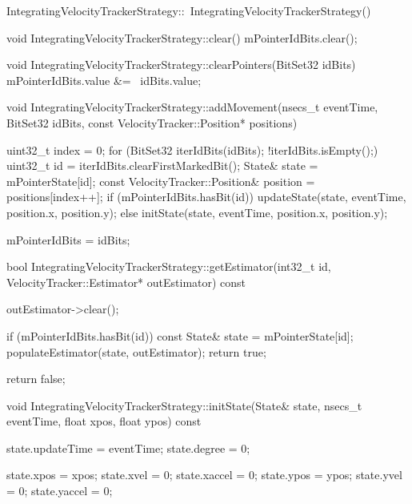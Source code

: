 IntegratingVelocityTrackerStrategy::~IntegratingVelocityTrackerStrategy() {
}

void IntegratingVelocityTrackerStrategy::clear() {
    mPointerIdBits.clear();
}

void IntegratingVelocityTrackerStrategy::clearPointers(BitSet32 idBits) {
    mPointerIdBits.value &= ~idBits.value;
}

void IntegratingVelocityTrackerStrategy::addMovement(nsecs_t eventTime, BitSet32 idBits,
                                                     const VelocityTracker::Position* positions) {
    uint32_t index = 0;
    for (BitSet32 iterIdBits(idBits); !iterIdBits.isEmpty();) {
        uint32_t id = iterIdBits.clearFirstMarkedBit();
        State& state = mPointerState[id];
        const VelocityTracker::Position& position = positions[index++];
        if (mPointerIdBits.hasBit(id)) {
            updateState(state, eventTime, position.x, position.y);
        } else {
            initState(state, eventTime, position.x, position.y);
        }
    }
    
    mPointerIdBits = idBits;
}

bool IntegratingVelocityTrackerStrategy::getEstimator(int32_t id,
                                                      VelocityTracker::Estimator* outEstimator) const {
    outEstimator->clear();
    
    if (mPointerIdBits.hasBit(id)) {
        const State& state = mPointerState[id];
        populateEstimator(state, outEstimator);
        return true;
    }
    
    return false;
}

void IntegratingVelocityTrackerStrategy::initState(State& state,
                                                   nsecs_t eventTime, float xpos, float ypos) const {
    state.updateTime = eventTime;
    state.degree = 0;
    
    state.xpos = xpos;
    state.xvel = 0;
    state.xaccel = 0;
    state.ypos = ypos;
    state.yvel = 0;
    state.yaccel = 0;
}

